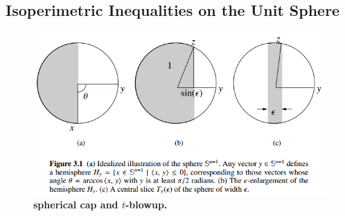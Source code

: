 \documentclass[11pt]{article}
\begin{document}
\subsection{Isoperimetric Inequalities on the Unit Sphere}
\begin{itemize}
%
\begin{figure}
\begin{minipage}[t]{1\linewidth}
  \centering
  \centerline{\includegraphics[scale = 0.5]{spherical_cap_blowup.png}}
\end{minipage}
\caption{\footnotesize{\textbf{spherical cap and $t$-blowup.   \citep{wainwright2019high}}}}
\label{fig: spherical_cap_blowup}
\end{figure}



\end{itemize}
\end{document}
